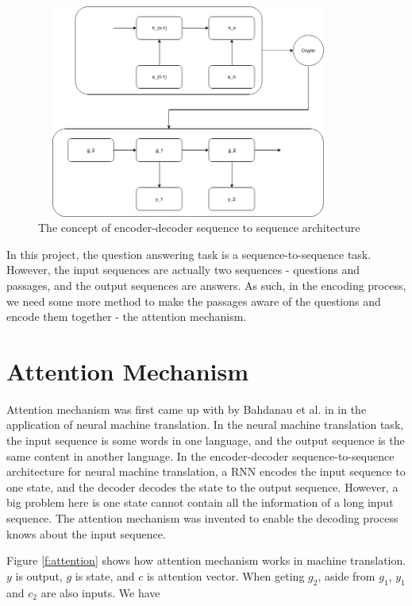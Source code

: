 \documentclass[modernstyle,12pt]{sjsuthesis}
\theoremstyle{definition}
\begin{document}
\begin{figure}[htbp]\centering
  \includegraphics[width=10cm, height=7cm]{figures/encoderDecoder.png}
  \caption{The concept of encoder-decoder sequence to sequence architecture}
  \label{f:encoderDecoder}
\end{figure}

In this project, the question answering task is a sequence-to-sequence task. However, the input sequences are actually two sequences - questions and passages, and the output sequences are answers. As such, in the encoding process, we need some more method to make the passages aware of the questions and encode them together - the attention mechanism.

\section{Attention Mechanism}\label{sect:attention}

Attention mechanism was first came up with by Bahdanau et al. in \cite{bahdanau2014neural} in the application of neural machine translation. In the neural machine translation task, the input sequence is some words in one language, and the output sequence is the same content in another language. In the encoder-decoder sequence-to-sequence architecture for neural machine translation, a RNN encodes the input sequence to one state, and the decoder decodes the state to the output sequence. However, a big problem here is one state cannot contain all the information of a long input sequence. The attention mechanism was invented to enable the decoding process knows about the input sequence.

Figure \ref{f:attention} shows how attention mechanism works in machine translation. $y$ is output, $g$ is state, and $c$ is attention vector. When geting $g_2$, aside from $g_1$, $y_1$ and $c_2$ are also inputs. We have
\end{document}
